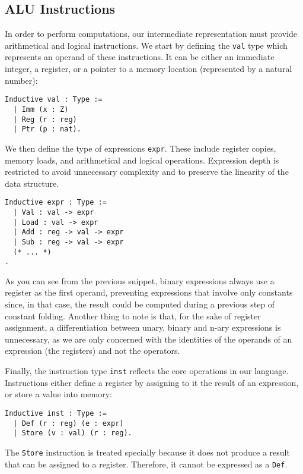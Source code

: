 \subsection{ALU Instructions}

In order to perform computations, our intermediate representation must provide arithmetical and logical instructions.
We start by defining the \texttt{val} type which represents an operand of these instructions. It can be either an immediate integer, a register, or a pointer to a memory location (represented by a natural number):

\begin{lstlisting}[style=Coq]
Inductive val : Type :=
  | Imm (x : Z)
  | Reg (r : reg)
  | Ptr (p : nat).
\end{lstlisting}

We then define the type of expressions \texttt{expr}. These include register copies, memory loads, and arithmetical and logical operations. Expression depth is restricted to avoid unnecessary complexity and to preserve the linearity of the data structure.

\begin{lstlisting}[style=Coq]
Inductive expr : Type :=
  | Val : val -> expr
  | Load : val -> expr
  | Add : reg -> val -> expr
  | Sub : reg -> val -> expr
  (* ... *)
.
\end{lstlisting}

As you can see from the previous snippet, binary expressions always use a register as the first operand, preventing expressions that involve only constants since, in that case, the result could be computed during a previous step of constant folding. Another thing to note is that, for the sake of register assignment, a differentiation between unary, binary and n-ary expressions is unnecessary, as we are only concerned with the identities of the operands of an expression (the registers) and not the operators.

Finally, the instruction type \texttt{inst} reflects the core operations in our language. Instructions either define a register by assigning to it the result of an expression, or store a value into memory:

\begin{lstlisting}[style=Coq]
Inductive inst : Type :=
  | Def (r : reg) (e : expr)
  | Store (v : val) (r : reg).
\end{lstlisting}

The \texttt{Store} instruction is treated specially because it does not produce a result that can be assigned to a register. Therefore, it cannot be expressed as a \texttt{Def}.

